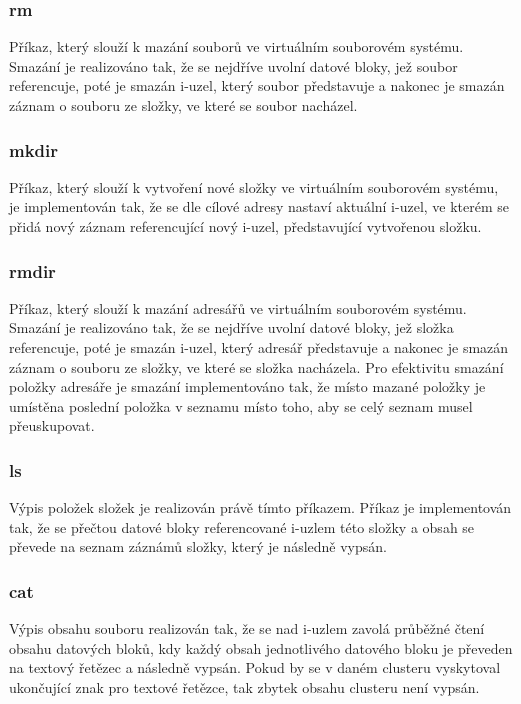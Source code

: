 \documentclass[12pt, a4paper]{article}
\begin{document}
		\subsubsection{rm}
		Příkaz, který slouží k mazání souborů ve virtuálním souborovém systému. Smazání je realizováno tak, že se nejdříve uvolní datové bloky, jež soubor referencuje, poté je smazán i-uzel, který soubor představuje a nakonec je smazán záznam o souboru ze složky, ve které se soubor nacházel.

		\subsubsection{mkdir}
		Příkaz, který slouží k vytvoření nové složky ve virtuálním souborovém systému, je implementován tak, že se dle cílové adresy nastaví aktuální i-uzel, ve kterém se přidá nový záznam referencující nový i-uzel, představující vytvořenou složku.
		
		\subsubsection{rmdir}
		Příkaz, který slouží k mazání adresářů ve virtuálním souborovém systému. Smazání je realizováno tak, že se nejdříve uvolní datové bloky, jež složka referencuje, poté je smazán i-uzel, který adresář představuje a nakonec je smazán záznam o souboru ze složky, ve které se složka nacházela. Pro efektivitu smazání položky adresáře je smazání implementováno tak, že místo mazané položky je umístěna poslední položka v seznamu místo toho, aby se celý seznam musel přeuskupovat.
		
		\subsubsection{ls}
		Výpis položek složek je realizován právě tímto příkazem. Příkaz je implementován tak, že se přečtou datové bloky referencované i-uzlem této složky a obsah se převede na seznam záznámů složky, který je následně vypsán.
				
		\subsubsection{cat}
		Výpis obsahu souboru realizován tak, že se nad i-uzlem zavolá průběžné čtení obsahu datových bloků, kdy každý obsah jednotlivého datového bloku je převeden na textový řetězec a následně vypsán. Pokud by se v daném clusteru vyskytoval ukončující znak pro textové řetězce, tak zbytek obsahu clusteru není vypsán.
				
\end{document}
